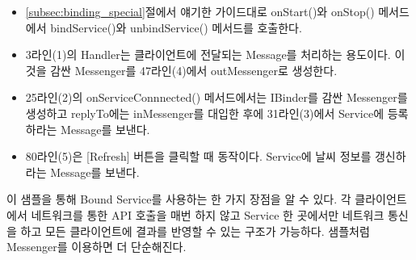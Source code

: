 \begin{itemize}
\item \ref{subsec:binding_special}절에서 얘기한 가이드대로 onStart()와 onStop() 메서드에서 bindService()와 unbindService() 메서드를 호출한다.
\item 3라인(1)의 Handler는 클라이언트에 전달되는 Message를 처리하는 용도이다. 이것을 감싼 Messenger를 47라인(4)에서 outMessenger로 생성한다.
\item 25라인(2)의 onServiceConnnected() 메서드에서는 IBinder를 감싼 Messenger를 생성하고 replyTo에는 inMessenger를 대입한 후에  31라인(3)에서 Service에 등록하라는 Message를  보낸다.
\item 80라인(5)은 [Refresh] 버튼을 클릭할 때 동작이다. Service에 날씨 정보를 갱신하라는 Message를 보낸다.
\end{itemize}

이 샘플을 통해 Bound Service를 사용하는 한 가지 장점을 알 수 있다. 각 클라이언트에서 네트워크를 통한 API 호출을 매번 하지 않고 Service 한 곳에서만 네트워크 통신을 하고 모든 클라이언트에 결과를 반영할 수 있는 구조가 가능하다. 샘플처럼 Messenger를 이용하면 더 단순해진다.
